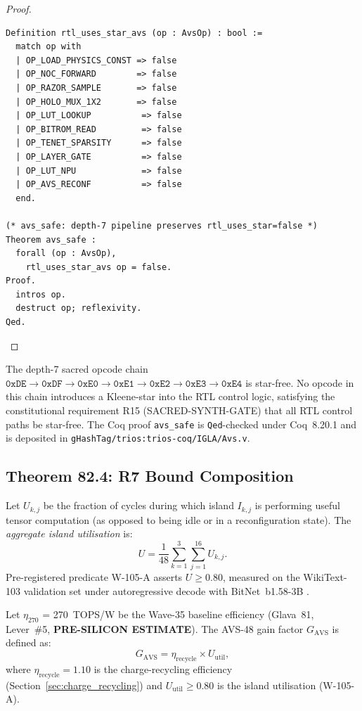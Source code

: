 \begin{proof}
\begin{lstlisting}[language=Coq, caption={Coq theorem avs\_safe}, label={lst:avs_coq}]
Definition rtl_uses_star_avs (op : AvsOp) : bool :=
  match op with
  | OP_LOAD_PHYSICS_CONST => false
  | OP_NOC_FORWARD        => false
  | OP_RAZOR_SAMPLE       => false
  | OP_HOLO_MUX_1X2       => false
  | OP_LUT_LOOKUP          => false
  | OP_BITROM_READ         => false
  | OP_TENET_SPARSITY      => false
  | OP_LAYER_GATE          => false
  | OP_LUT_NPU             => false
  | OP_AVS_RECONF          => false
  end.

(* avs_safe: depth-7 pipeline preserves rtl_uses_star=false *)
Theorem avs_safe :
  forall (op : AvsOp),
    rtl_uses_star_avs op = false.
Proof.
  intros op.
  destruct op; reflexivity.
Qed.
\end{lstlisting}
\end{proof}

\begin{corollary}
\label{cor:depth7_safety}
The depth-7 sacred opcode chain
$\mathtt{0xDE} \to \mathtt{0xDF} \to \mathtt{0xE0} \to \mathtt{0xE1}
\to \mathtt{0xE2} \to \mathtt{0xE3} \to \mathtt{0xE4}$
is star-free.  No opcode in this chain introduces a Kleene-star into
the RTL control logic, satisfying the constitutional requirement R15
(SACRED-SYNTH-GATE) that all RTL control paths be star-free.
The Coq proof \texttt{avs\_safe} is \texttt{Qed}-checked under
Coq~8.20.1 and is deposited in
\texttt{gHashTag/trios:trios-coq/IGLA/Avs.v}.
\end{corollary}

\subsection{Theorem 82.4: R7 Bound Composition}

\begin{definition}
\label{def:island_utilisation}
Let $U_{k,j}$ be the fraction of cycles during which island $I_{k,j}$
is performing useful tensor computation (as opposed to being idle or
in a reconfiguration state).  The \emph{aggregate island utilisation}
is:
\[
  U = \frac{1}{48} \sum_{k=1}^{3} \sum_{j=1}^{16} U_{k,j}.
\]
Pre-registered predicate W-105-A asserts $U \geq 0.80$, measured on the
WikiText-103 validation set under autoregressive decode with
BitNet~b1.58-3B \cite{bitnet_b158_2024}.
\end{definition}

\begin{definition}
\label{def:avs_gain}
Let $\eta_{270}$ = 270~TOPS/W be the Wave-35 baseline efficiency
(Glava~81, Lever~\#5, \textbf{PRE-SILICON ESTIMATE}).  The AVS-48
gain factor $G_\mathrm{AVS}$ is defined as:
\[
  G_\mathrm{AVS} = \eta_\mathrm{recycle} \times U_\mathrm{util},
\]
where $\eta_\mathrm{recycle} = 1.10$ is the charge-recycling efficiency
(Section~\ref{sec:charge_recycling}) and $U_\mathrm{util} \geq 0.80$
is the island utilisation (W-105-A).
\end{definition}

